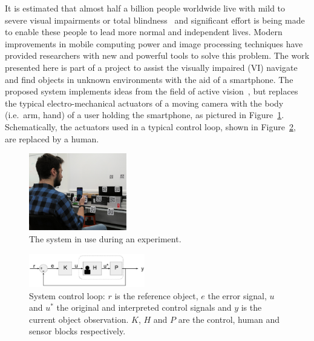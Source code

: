 \documentclass[a4paper, twoside]{article}
\begin{document}
\noindent It is estimated that almost half a billion people worldwide live with mild to severe visual impairments or total blindness~\cite{bourne2017magnitude} and significant effort is being made to enable these people to lead more normal and independent lives. Modern improvements in mobile computing power and image processing techniques have provided researchers with new and powerful tools to solve this problem. The work presented here is part of a project to assist the visually impaired (VI) navigate and find objects in unknown environments with the aid of a smartphone. The proposed system implements ideas from the field of active vision~\cite{Bajcsy2017,bellotto2013}, but replaces the typical electro-mechanical actuators of a moving camera with the body (i.e.\ arm, hand) of a user holding the smartphone, as pictured in Figure~\ref{fig:system-use}. Schematically, the actuators used in a typical control loop, shown in Figure~\ref{fig:control-loop}, are replaced by a human. %

\begin{figure}
  \centering
  \includegraphics[width=0.38\textwidth]{figures/system_use.png}
  \caption{The system in use during an experiment. }\label{fig:system-use}
\end{figure}

\begin{figure}
  \centering
  \includegraphics[width=0.45\textwidth]{figures/control_loop.png}
  \caption{System control loop: $r$ is the reference object, $e$ the error signal, $u$ and $u^*$ the original and interpreted control signals and $y$ is the current object observation. $K$, $H$ and $P$ are the control, human and sensor blocks respectively. }\label{fig:control-loop}
\end{figure}
\end{document}
